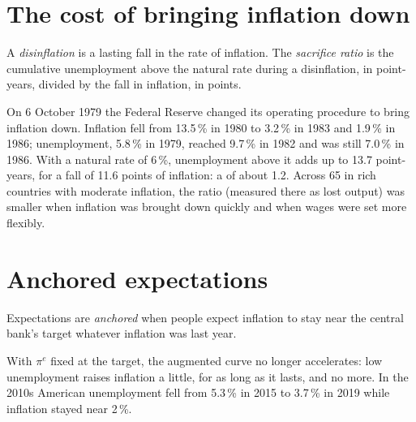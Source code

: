 \section{The cost of bringing inflation down}\label{sec:g12:phillips-curve:disinflation}

\begin{definition}\label{def:g12:phillips-curve:disinflation}
A \emph{disinflation} is a lasting fall in the rate of inflation. The \emph{sacrifice ratio}%
\label{def:g12:phillips-curve:sacrifice-ratio} is the cumulative unemployment above the natural rate during a disinflation, in point-years, divided by the fall
in inflation, in points.
\end{definition}

\begin{record}[The disinflation of 1980--86 and its cost]
On 6 October 1979 the Federal Reserve changed its operating procedure to bring inflation down. Inflation fell from 13.5\,\% in 1980 to 3.2\,\% in 1983 and 1.9\,\% in 1986; unemployment, 5.8\,\% in
1979, reached 9.7\,\% in 1982 and was still 7.0\,\% in 1986. With a natural rate of 6\,\%, unemployment above it adds up to 13.7 point-years, for a fall of 11.6 points of
inflation: a  of about 1.2. Across 65  in rich countries with moderate inflation, the ratio (measured there as lost output) was smaller when inflation was brought down
quickly and when wages were set more flexibly.
\end{record}

\section{Anchored expectations}\label{sec:g12:phillips-curve:anchored}

\begin{definition}\label{def:g12:phillips-curve:anchored}
Expectations are \emph{anchored} when people expect inflation to stay near the central bank's target whatever inflation was last year.
\end{definition}

With $\pi^e$ fixed at the target, the augmented curve no longer accelerates: low unemployment raises inflation a little, for as long as it lasts, and no more. In the 2010s
American unemployment fell from 5.3\,\% in 2015 to 3.7\,\% in 2019 while inflation stayed near 2\,\%.

